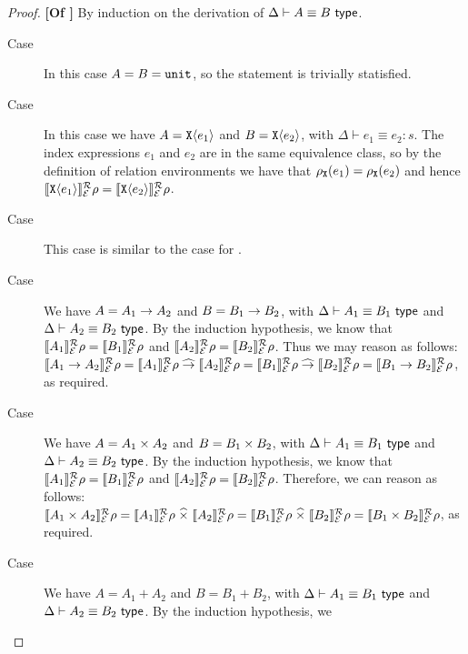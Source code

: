 \begin{proof}\textbf{[Of ]}
  By induction on the derivation of $\Delta \vdash A \equiv B \textsf{ type}$.
  \begin{description}
  \item[Case ] In this case $A = B = \texttt{unit}$, so
    the statement is trivially statisfied.
  \item[Case ] In this case we have $A =
    \texttt{X}\langle e_1 \rangle$ and $B = \texttt{X}\langle e_2 \rangle$, with $\Delta \vdash
    e_1 \equiv e_2 : s$. The index expressions $e_1$ and $e_2$ are in
    the same equivalence class, so by the definition of relation
    environments we have that $\rho_{\texttt{X}}(e_1) =
    \rho_{\texttt{X}}(e_2)$ and hence
    $\llbracket \texttt{X}\langle e_1 \rangle \rrbracket^{\mathcal{R}}_{\mathcal{E}}{\rho} =
    \llbracket \texttt{X}\langle e_2 \rangle \rrbracket^{\mathcal{R}}_{\mathcal{E}}{\rho}$.
  \item[Case ] This case is similar to the case
    for .
  \item[Case ] We have $A = A_1 \to A_2$ and $B =
    B_1 \to B_2$, with $\Delta \vdash A_1 \equiv B_1 \textsf{ type}$ and
    $\Delta \vdash A_2 \equiv B_2 \textsf{ type}$. By the induction
    hypothesis, we know that $\llbracket A_1 \rrbracket^{\mathcal{R}}_{\mathcal{E}}{\rho} =
    \llbracket B_1 \rrbracket^{\mathcal{R}}_{\mathcal{E}}{\rho}$ and $\llbracket A_2 \rrbracket^{\mathcal{R}}_{\mathcal{E}}{\rho} =
    \llbracket B_2 \rrbracket^{\mathcal{R}}_{\mathcal{E}}{\rho}$. Thus we may reason as follows:
    $\llbracket A_1 \to A_2 \rrbracket^{\mathcal{R}}_{\mathcal{E}}{\rho} =
    \llbracket A_1 \rrbracket^{\mathcal{R}}_{\mathcal{E}}{\rho} \mathrel{\widehat\to} \llbracket A_2 \rrbracket^{\mathcal{R}}_{\mathcal{E}}{\rho} =
    \llbracket B_1 \rrbracket^{\mathcal{R}}_{\mathcal{E}}{\rho} \mathrel{\widehat\to} \llbracket B_2 \rrbracket^{\mathcal{R}}_{\mathcal{E}}{\rho} =
    \llbracket B_1 \to B_2 \rrbracket^{\mathcal{R}}_{\mathcal{E}}{\rho}$, as required.
  \item[Case ] We have $A = A_1 \times A_2$ and
    $B = B_1 \times B_2$, with $\Delta \vdash A_1 \equiv B_1
    \textsf{ type}$ and $\Delta \vdash A_2 \equiv B_2 \textsf{ type}$. By the
    induction hypothesis, we know that $\llbracket A_1 \rrbracket^{\mathcal{R}}_{\mathcal{E}}{\rho} =
    \llbracket B_1 \rrbracket^{\mathcal{R}}_{\mathcal{E}}{\rho}$ and $\llbracket A_2 \rrbracket^{\mathcal{R}}_{\mathcal{E}}{\rho} =
    \llbracket B_2 \rrbracket^{\mathcal{R}}_{\mathcal{E}}{\rho}$. Therefore, we can reason as follows:
    $\llbracket A_1 \times A_2 \rrbracket^{\mathcal{R}}_{\mathcal{E}}{\rho} =
    \llbracket A_1 \rrbracket^{\mathcal{R}}_{\mathcal{E}}{\rho} \mathrel{\widehat\times} \llbracket A_2 \rrbracket^{\mathcal{R}}_{\mathcal{E}}{\rho} =
    \llbracket B_1 \rrbracket^{\mathcal{R}}_{\mathcal{E}}{\rho} \mathrel{\widehat\times} \llbracket B_2 \rrbracket^{\mathcal{R}}_{\mathcal{E}}{\rho} =
    \llbracket B_1 \times B_2 \rrbracket^{\mathcal{R}}_{\mathcal{E}}{\rho}$, as required.
  \item[Case ] We have $A = A_1 + A_2$ and $B = B_1 +
    B_2$, with $\Delta \vdash A_1 \equiv B_1 \textsf{ type}$ and $\Delta
    \vdash A_2 \equiv B_2 \textsf{ type}$. By the induction hypothesis, we

\end{description}
\end{proof}
